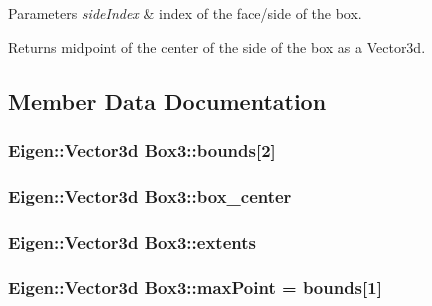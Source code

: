 \begin{DoxyParams}{Parameters}
{\em side\+Index} & index of the face/side of the box. \\
\hline
\end{DoxyParams}
\begin{DoxyReturn}{Returns}
midpoint of the center of the side of the box as a Vector3d. 
\end{DoxyReturn}


\subsection{Member Data Documentation}
\subsubsection[{\texorpdfstring{bounds}{bounds}}]{\setlength{\rightskip}{0pt plus 5cm}Eigen\+::\+Vector3d Box3\+::bounds\mbox{[}2\mbox{]}}\hypertarget{class_box3_aad114a73fc86f48a459d97036afacdd1}{}\label{class_box3_aad114a73fc86f48a459d97036afacdd1}
\subsubsection[{\texorpdfstring{box\+\_\+center}{box_center}}]{\setlength{\rightskip}{0pt plus 5cm}Eigen\+::\+Vector3d Box3\+::box\+\_\+center}\hypertarget{class_box3_ad3d48cf0bac3a7963fbf1fec90d06836}{}\label{class_box3_ad3d48cf0bac3a7963fbf1fec90d06836}
\subsubsection[{\texorpdfstring{extents}{extents}}]{\setlength{\rightskip}{0pt plus 5cm}Eigen\+::\+Vector3d Box3\+::extents}\hypertarget{class_box3_a5aea4c92dc0926d4a9577b65c402b1b2}{}\label{class_box3_a5aea4c92dc0926d4a9577b65c402b1b2}
\subsubsection[{\texorpdfstring{max\+Point}{maxPoint}}]{\setlength{\rightskip}{0pt plus 5cm}Eigen\+::\+Vector3d Box3\+::max\+Point = {\bf bounds}\mbox{[}1\mbox{]}}\hypertarget{class_box3_a34149a4c4b920189fac72cc67bd4a156}{}\label{class_box3_a34149a4c4b920189fac72cc67bd4a156}
